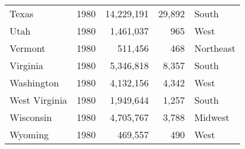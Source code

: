 \documentclass{exam}
\begin{document}
\begin{tabular}{lrrrl}
      Texas          & 1980 & 14,229,191       & 29,892            & South \\
      Utah           & 1980 & 1,461,037        & 965               & West \\
      Vermont        & 1980 & 511,456          & 468               & Northeast \\
      Virginia       & 1980 & 5,346,818        & 8,357             & South \\
      Washington     & 1980 & 4,132,156        & 4,342             & West \\
      West Virginia  & 1980 & 1,949,644        & 1,257             & South \\
      Wisconsin      & 1980 & 4,705,767        & 3,788             & Midwest \\
      Wyoming        & 1980 & 469,557          & 490               & West \\
      \bottomrule
    \end{tabular}
\end{document}
